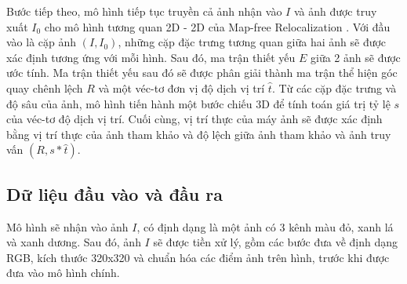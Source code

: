 Bước tiếp theo, mô hình tiếp tục truyền cả ảnh nhận vào $I$ và ảnh được truy xuất $I_0$ cho mô hình tương quan 2D - 2D của Map-free Relocalization \cite{arnold2022mapfree}. Với đầu vào là cặp ảnh $(I, I_0)$, những cặp đặc trưng tương quan giữa hai ảnh sẽ được xác định tương ứng với mỗi hình. Sau đó, ma trận thiết yếu $E$ giữa 2 ảnh sẽ được ước tính. Ma trận thiết yếu sau đó sẽ được phân giải thành ma trận thể hiện góc quay chênh lệch $R$ và một véc-tơ đơn vị độ dịch vị trí $\hat{t}$. Từ các cặp đặc trưng và độ sâu của ảnh, mô hình tiến hành một bước chiếu 3D để tính toán giá trị tỷ lệ $s$ của véc-tơ độ dịch vị trí. Cuối cùng, vị trí thực của máy ảnh sẽ được xác định bằng vị trí thực của ảnh tham khảo và độ lệch giữa ảnh tham khảo và ảnh truy vấn $(R,s*\hat{t})$.

\subsection{Dữ liệu đầu vào và đầu ra}
Mô hình sẽ nhận vào ảnh $I$, có định dạng là một ảnh có 3 kênh màu đỏ, xanh lá và xanh dương. Sau đó, ảnh $I$ sẽ được tiền xử lý, gồm các bước đưa về định dạng RGB, kích thước 320x320 và chuẩn hóa các điểm ảnh trên hình, trước khi được đưa vào mô hình chính.

